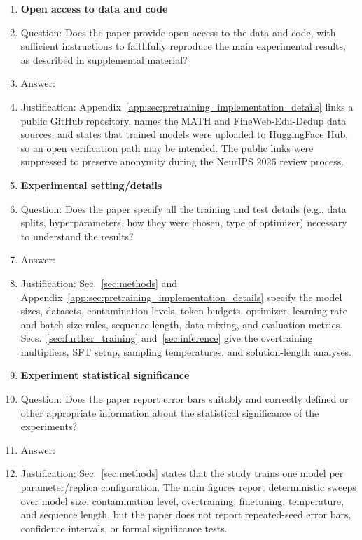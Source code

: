 \begin{enumerate}
\item {\bf Open access to data and code}
    \item[] Question: Does the paper provide open access to the data and code, with sufficient instructions to faithfully reproduce the main experimental results, as described in supplemental material?
    \item[] Answer: \answerNo{}
    \item[] Justification: Appendix~\ref{app:sec:pretraining_implementation_details} links a public GitHub repository, names the MATH and FineWeb-Edu-Dedup data sources, and states that trained models were uploaded to HuggingFace Hub, so an open verification path may be intended. The public links were suppressed to preserve anonymity during the NeurIPS 2026 review process.


\item {\bf Experimental setting/details}
    \item[] Question: Does the paper specify all the training and test details (e.g., data splits, hyperparameters, how they were chosen, type of optimizer) necessary to understand the results?
    \item[] Answer: \answerYes{}
    \item[] Justification: Sec.~\ref{sec:methods} and Appendix~\ref{app:sec:pretraining_implementation_details} specify the model sizes, datasets, contamination levels, token budgets, optimizer, learning-rate and batch-size rules, sequence length, data mixing, and evaluation metrics. Secs.~\ref{sec:further_training} and~\ref{sec:inference} give the overtraining multipliers, SFT setup, sampling temperatures, and solution-length analyses.

\item {\bf Experiment statistical significance}
    \item[] Question: Does the paper report error bars suitably and correctly defined or other appropriate information about the statistical significance of the experiments?
    \item[] Answer: \answerNo{}
    \item[] Justification: Sec.~\ref{sec:methods} states that the study trains one model per parameter/replica configuration. The main figures report deterministic sweeps over model size, contamination level, overtraining, finetuning, temperature, and sequence length, but the paper does not report repeated-seed error bars, confidence intervals, or formal significance tests.


\end{enumerate}
